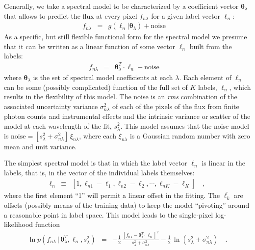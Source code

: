 \documentclass[12pt, preprint]{aastex}
\newcommand{\set}[1]{\bm{#1}}
\newcommand{\starlabel}{\ell}
\newcommand{\starlabelvec}{\set{\starlabel}}
\newcommand{\mean}[1]{\overline{#1}}
\newcommand{\given}{\,|\,}
\begin{document}
Generally, we take a spectral model to be characterized by a coefficient vector $\set{\theta}_\lambda$
that allows to predict the flux at every pixel $f_{n\lambda}$ for a given label vector 
$\starlabelvec_n$:
\begin{eqnarray}
f_{n\lambda} &=&
g(\starlabelvec_n |  \set{\theta}_\lambda) + \mbox{noise}
\label{eq:specmodel}\quad 
\end{eqnarray}
As a specific, but still flexible functional form for the spectral model we presume that it can be written as
a linear function of some vector $\starlabelvec_n$ built from the labels: 
\begin{eqnarray}
f_{n\lambda} &=&
\set{\theta}_\lambda^T \cdot \starlabelvec_n + \mbox{noise}
\label{eq:linearmodel}\quad
\end{eqnarray}
where $\set{\theta}_\lambda$ is the set of spectral model coefficients at each $\lambda$. Each element of $\starlabelvec_n$ can be some (possibly complicated) function of the full set of $K$ labels, $\starlabelvec_n$, which
results in the flexibility of this model. The noise is an \textit{rms} combination of the associated uncertainty variance
$\sigma_{n\lambda}^2$ of each of the pixels of the flux from finite photon counts and instrumental effects and the intrinsic variance or scatter of the model at each wavelength of the fit, $s_\lambda^2$.
This model assumes that the noise model is
$\mbox{noise} = [s_\lambda^2+ \sigma_{n\lambda}^2]\,\xi_{n\lambda}$,
where each $\xi_{n\lambda}$ is a Gaussian random number with zero mean and unit
variance.

The simplest spectral model is that in which the label vector $\starlabelvec_n$ is
linear in the labels, that is, in the vector of the individual labels themselves:
\begin{eqnarray}
\starlabelvec_n &\equiv& [1,
                           \starlabel_{n1} - \mean{\starlabel_1},
                           \starlabel_{n2} - \mean{\starlabel_2},
                           \cdots,
                           \starlabel_{nK} - \mean{\starlabel_K}]
\label{eq:linear}\quad,
\end{eqnarray}
where the first element ``1'' will permit a linear offset in the fitting.
The $\mean{\starlabel_k}$ are offsets (possibly means of the training data) to
keep the model ``pivoting'' around a reasonable point in label space.
This model leads to the single-pixel log-likelihood function 
\begin{eqnarray}
\ln p(f_{n\lambda}\given\set{\theta}^T_\lambda, \starlabelvec_n, s_\lambda^2) &=&
 -\frac{1}{2}\,\frac{[f_{n\lambda} - \set{\theta}^T_\lambda \cdot \starlabelvec_n]^2}{s_\lambda^2 + \sigma_{n\lambda}^2}
 -\frac{1}{2}\,\ln(s_\lambda^2 + \sigma_{n\lambda}^2)
\label{eq:like}\quad.
\end{eqnarray}
\end{document}
